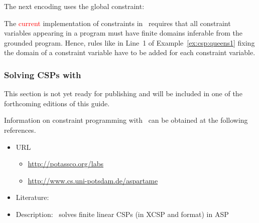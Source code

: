 \begin{example}
The next encoding uses the global  constraint:
%
%

\end{example}

\begin{note}
The \textcolor{red}{current} implementation of constraints in \gringo\ requires 
that all constraint variables appearing in a program must have finite domains inferable from the grounded program.
Hence, rules like in Line~1 of Example~\ref{ex:csp:queens1} fixing the domain of a constraint variable have to be added for each constraint variable.
\end{note}

\subsubsection{Solving CSPs with \aspartame}
\label{sec:aspartame}

This section is not yet ready for publishing
and will be included in one of the forthcoming editions of this guide.

Information on constraint programming with \aspartame\ can be obtained at the following references.

\begin{itemize}
\item URL
\begin{itemize}
\item \url{http://potassco.org/labs}
\item \url{http://www.cs.uni-potsdam.de/aspartame}
\end{itemize}
\item Literature: \cite{bageinscsotawe13a}
\item Description: \aspartame\ solves finite linear CSPs (in XCSP and \sugar{} format) in ASP
\end{itemize}

